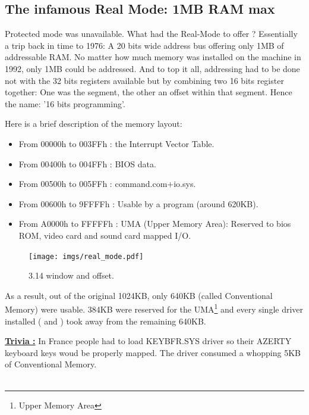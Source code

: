 \documentclass[book.tex]{subfiles}
\begin{document}
  \subsection{The infamous Real Mode: 1MB RAM max}
  Protected mode was unavailable. What had the Real-Mode to offer ? Essentially a trip back in time to 1976: A 20 bits wide address bus offering only 1MB of addressable RAM. No matter how much memory was installed on the machine in 1992, only 1MB could be addressed. And to top it all, addressing had to be done not with the 32 bits registers available but by combining two 16 bits register together: One was the segment, the other an offset within that segment. Hence the name: '16 bits programming'.

  \bigskip
Here is a brief description of the memory layout: \\
\begin{itemize}
\item From 00000h to 003FFh : the Interrupt Vector Table.
\item From 00400h to 004FFh : BIOS data.
\item From 00500h to 005FFh : command.com+io.sys.
\item From 00600h to 9FFFFh : Usable by a program (around 620KB). 
\item From A0000h to FFFFFh : UMA (Upper Memory Area): Reserved to bios ROM, video card and sound card mapped I/O.
\end{itemize}

\begin{figure}[H]
\centering
\texttt{[image: imgs/real\_mode.pdf]}

\caption{3.14 window and offset.}
\label{fig:fp_internals}
\end{figure}


As a result, out of the original 1024KB, only 640KB (called Conventional Memory) were usable. 384KB were reserved for the UMA\footnote{Upper Memory Area} and every single driver installed ( and )  took away from the remaining 640KB.

\bigskip

\textbf{\underline{Trivia :}}  In France people had to load KEYBFR.SYS driver so their AZERTY keyboard keys woud be properly mapped. The driver consumed a whopping 5KB of Conventional Memory.\\
\\
\end{document}
